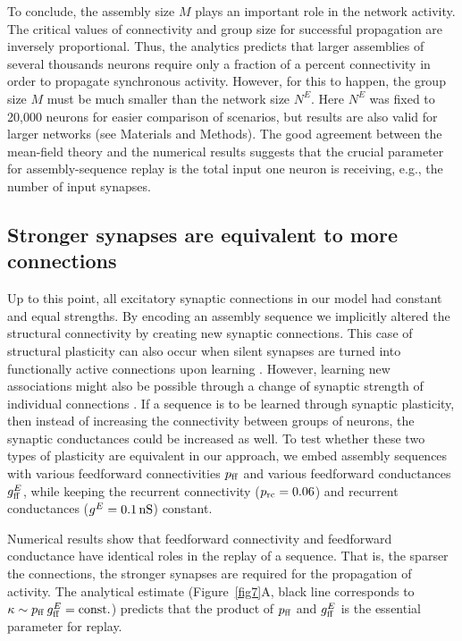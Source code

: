     To conclude, the assembly size $M$ plays an important role in the network
    activity. The critical values of connectivity and group size for
    successful propagation are inversely proportional. Thus, the analytics
    predicts that larger assemblies of several thousands neurons require only a
    fraction of a percent connectivity in order to propagate synchronous
    activity. However, for this to happen, the group size $M$ must be much
    smaller than the network size $N^E$. Here $N^E$ was fixed to 20,000
    neurons for easier comparison of scenarios, but results are also valid for
    larger networks (see Materials and Methods). The good agreement between
    the mean-field theory and the numerical results suggests that the crucial
    parameter for assembly-sequence replay is the total input one neuron is
    receiving, e.g., the number of input synapses.

  \subsection{Stronger synapses are equivalent to more connections}
    Up to this point, all excitatory synaptic connections in our model had
    constant and equal strengths.  By encoding an assembly sequence we
    implicitly altered the structural connectivity by creating new synaptic
    connections.  This case of structural plasticity can also occur when silent
    synapses are turned into functionally active connections upon learning
    \citep{Atwood1999, Hanse2013}.  However, learning new associations might
    also be possible through a change of synaptic strength of individual
    connections \citep{Bliss1973, Malenka2004}.  If a sequence is to be learned
    through synaptic plasticity, then instead of increasing the connectivity
    between groups of neurons, the synaptic conductances could be increased as
    well.  To test whether these two types of plasticity are equivalent in our
    approach, we embed assembly sequences with various feedforward
    connectivities $p_{\rm ff}$ and various feedforward conductances
    $g^{E}_{\rm ff}$, while keeping the recurrent connectivity ($p_{\rm
    rc}=0.06$) and recurrent conductances ($g^E=0.1 \, \rm nS$) constant.

    Numerical results show that feedforward connectivity and feedforward
    conductance have identical roles in the replay of a sequence.  That is, the
    sparser the connections, the stronger synapses are required for the
    propagation of activity.  The analytical estimate (Figure~\ref{fig7}A,
    black line corresponds to $\kappa \sim p_{\rm ff} \, g^{E}_{\rm ff} = {\rm
    const.}$) predicts that the product of $p_{\rm ff}$ and $g^{E}_{\rm ff}$ is
    the essential parameter for replay.

